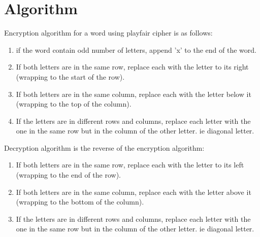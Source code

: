 \section{Algorithm}
Encryption algorithm for a word using playfair cipher is as follows:
\begin{enumerate}
  \item if the word contain odd number of letters, append 'x' to the end of the word.
  \item If both letters are in the same row, replace each with the letter to its right (wrapping to the start of the row).
  \item If both letters are in the same column, replace each with the letter below it (wrapping to the top of the column).
  \item If the letters are in different rows and columns, replace each letter with the one in the same row but in the column of the other letter. ie diagonal letter.
\end{enumerate}

Decryption algorithm is the reverse of the encryption algorithm:
\begin{enumerate}
  \item If both letters are in the same row, replace each with the letter to its left (wrapping to the end of the row).
  \item If both letters are in the same column, replace each with the letter above it (wrapping to the bottom of the column).
  \item If the letters are in different rows and columns, replace each letter with the one in the same row but in the column of the other letter. ie diagonal letter.
\end{enumerate}




